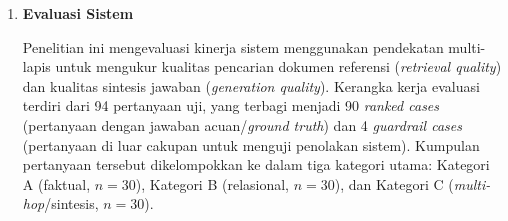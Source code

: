 \begin{enumerate}[label=\textbf{\arabic*.}, leftmargin=*, itemsep=10pt]
\begin{enumerate}[label=\textbf{\alph*.}, leftmargin=*, itemsep=5pt]
\begin{enumerate}[label=\textbf{\arabic*.}, leftmargin=*, itemsep=6pt]
                        \item \textbf{\textit{Data Truncation}:} Data dipangkas hingga total token memenuhi ambang batas komputasi.

                    \end{enumerate}

                    \noindent
                    Mekanisme ini menghasilkan konteks global yang kaya akan informasi hubungan, yang diformulasikan dalam persamaan:
                    \begin{equation}
                        \mathcal{L}_{\text{global}} = (\mathcal{E}_{\text{global}}, \mathcal{R}_{\text{global}}, \mathcal{T}_{\text{global}})
                        = \text{pipeline}_{\text{global}}(\mathcal{K}_h, G).
                    \end{equation}
                    \noindent
                    Sinergi antara presisi tinggi \textit{Local Retrieval} dan cakupan luas \textit{Global Retrieval} menjadi keunggulan utama arsitektur \textit{GraphRAG} dalam menangani kompleksitas literatur ilmiah.

              \item \textbf{\textit{LLM Generation} \& \textit{Response}}

                    \hspace*{0.75cm}Tahap ini merupakan fase akhir, di mana informasi yang telah diekstraksi dari \textit{local} dan \textit{global} disintesis. Konteks yang terintegrasi ini kemudian disatukan dengan kueri asli pengguna untuk membentuk sebuah \textit{augmented prompt}. \textit{Augmented prompt} ini kemudian dikirimkan ke \textit{LLM} untuk menghasilkan jawaban akhir.
          \end{enumerate}

    \item \textbf{Evaluasi Sistem}
          \label{subsec:system-evaluation}

          \hspace*{0.75cm}Penelitian ini mengevaluasi kinerja sistem menggunakan pendekatan multi-lapis untuk mengukur kualitas pencarian dokumen referensi (\textit{retrieval quality}) dan kualitas sintesis jawaban (\textit{generation quality}). Kerangka kerja evaluasi terdiri dari 94 pertanyaan uji, yang terbagi menjadi 90 \textit{ranked cases} (pertanyaan dengan jawaban acuan/\textit{ground truth}) dan 4 \textit{guardrail cases} (pertanyaan di luar cakupan untuk menguji penolakan sistem). Kumpulan pertanyaan tersebut dikelompokkan ke dalam tiga kategori utama: Kategori A (faktual, $n=30$), Kategori B (relasional, $n=30$), dan Kategori C (\textit{multi-hop}/sintesis, $n=30$).


\end{enumerate}
